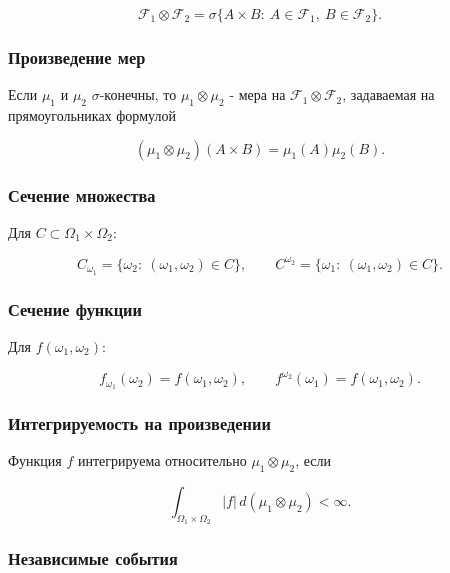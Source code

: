 \documentclass[
  11pt,
  a4paper,
]{article}
\begin{document}
\[
\mathcal F_1\otimes\mathcal F_2
=
\sigma\{A\times B:\ A\in\mathcal F_1,\ B\in\mathcal F_2\}.
\]

\subsubsection{Произведение
мер}\label{ux43fux440ux43eux438ux437ux432ux435ux434ux435ux43dux438ux435-ux43cux435ux440}

Если \(\mu_1\) и \(\mu_2\) \(\sigma\)-конечны, то \(\mu_1\otimes\mu_2\)
- мера на \(\mathcal F_1\otimes\mathcal F_2\), задаваемая на
прямоугольниках формулой

\[
(\mu_1\otimes\mu_2)(A\times B)=\mu_1(A)\mu_2(B).
\]

\subsubsection{Сечение
множества}\label{ux441ux435ux447ux435ux43dux438ux435-ux43cux43dux43eux436ux435ux441ux442ux432ux430}

Для \(C\subset\Omega_1\times\Omega_2\):

\[
C_{\omega_1}=\{\omega_2:\ (\omega_1,\omega_2)\in C\},
\qquad
C^{\omega_2}=\{\omega_1:\ (\omega_1,\omega_2)\in C\}.
\]

\subsubsection{Сечение
функции}\label{ux441ux435ux447ux435ux43dux438ux435-ux444ux443ux43dux43aux446ux438ux438}

Для \(f(\omega_1,\omega_2)\):

\[
f_{\omega_1}(\omega_2)=f(\omega_1,\omega_2),
\qquad
f^{\omega_2}(\omega_1)=f(\omega_1,\omega_2).
\]

\subsubsection{Интегрируемость на
произведении}\label{ux438ux43dux442ux435ux433ux440ux438ux440ux443ux435ux43cux43eux441ux442ux44c-ux43dux430-ux43fux440ux43eux438ux437ux432ux435ux434ux435ux43dux438ux438}

Функция \(f\) интегрируема относительно \(\mu_1\otimes\mu_2\), если

\[
\int_{\Omega_1\times\Omega_2}|f|\,d(\mu_1\otimes\mu_2)<\infty.
\]

\subsubsection{Независимые
события}\label{ux43dux435ux437ux430ux432ux438ux441ux438ux43cux44bux435-ux441ux43eux431ux44bux442ux438ux44f}
\end{document}
